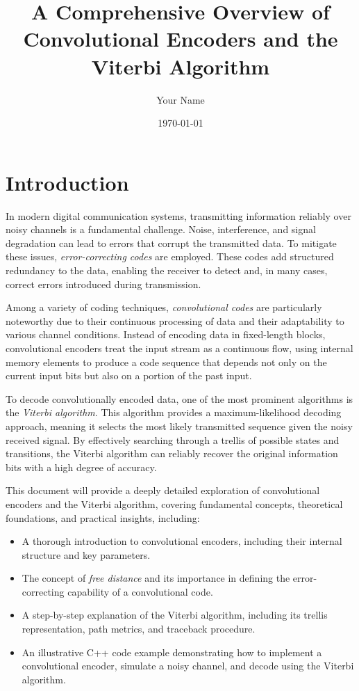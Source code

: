 \documentclass[12pt,a4paper]{article}
\title{A Comprehensive Overview of Convolutional Encoders and the Viterbi Algorithm}
\author{Your Name}
\date{\today}
\begin{document}
\maketitle

\tableofcontents

\section{Introduction}

In modern digital communication systems, transmitting information reliably over noisy channels is a fundamental challenge. Noise, interference, and signal degradation can lead to errors that corrupt the transmitted data. To mitigate these issues, \emph{error-correcting codes} are employed. These codes add structured redundancy to the data, enabling the receiver to detect and, in many cases, correct errors introduced during transmission.

Among a variety of coding techniques, \emph{convolutional codes} are particularly noteworthy due to their continuous processing of data and their adaptability to various channel conditions. Instead of encoding data in fixed-length blocks, convolutional encoders treat the input stream as a continuous flow, using internal memory elements to produce a code sequence that depends not only on the current input bits but also on a portion of the past input.

To decode convolutionally encoded data, one of the most prominent algorithms is the \emph{Viterbi algorithm}. This algorithm provides a maximum-likelihood decoding approach, meaning it selects the most likely transmitted sequence given the noisy received signal. By effectively searching through a trellis of possible states and transitions, the Viterbi algorithm can reliably recover the original information bits with a high degree of accuracy.

This document will provide a deeply detailed exploration of convolutional encoders and the Viterbi algorithm, covering fundamental concepts, theoretical foundations, and practical insights, including:
\begin{itemize}
    \item A thorough introduction to convolutional encoders, including their internal structure and key parameters.
    \item The concept of \emph{free distance} and its importance in defining the error-correcting capability of a convolutional code.
    \item A step-by-step explanation of the Viterbi algorithm, including its trellis representation, path metrics, and traceback procedure.
    \item An illustrative C++ code example demonstrating how to implement a convolutional encoder, simulate a noisy channel, and decode using the Viterbi algorithm.
\end{itemize}
\end{document}
